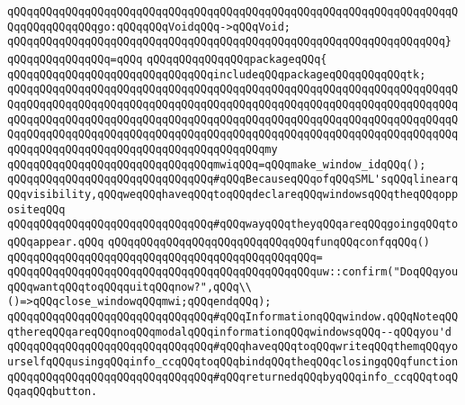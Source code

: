 \verb|qQQqqQQqqQQqqQQqqQQqqQQqqQQqqQQqqQQqqQQqqQQqqQQqqQQqqQQqqQQqqQQqqQQqqQQqqQQqqQQqqQQqgo:qQQqqQQqVoidqQQq->qQQqVoid;|\newline
\verb|qQQqqQQqqQQqqQQqqQQqqQQqqQQqqQQqqQQqqQQqqQQqqQQqqQQqqQQqqQQqqQQqqQQq}|\newline
\verb|qQQqqQQqqQQqqQQq=qQQq|\newline
\newline
\verb|qQQqqQQqqQQqqQQqpackageqQQq{|\newline
\newline
\verb|qQQqqQQqqQQqqQQqqQQqqQQqqQQqqQQqincludeqQQqpackageqQQqqQQqqQQqtk;|\newline
\verb|qQQqqQQqqQQqqQQqqQQqqQQqqQQqqQQqqQQqqQQqqQQqqQQqqQQqqQQqqQQqqQQqqQQqqQQqqQQqqQQqqQQqqQQqqQQqqQQqqQQqqQQqqQQqqQQqqQQqqQQqqQQqqQQqqQQqqQQqqQQqqQQqqQQqqQQqqQQqqQQqqQQqqQQqqQQqqQQqqQQqqQQqqQQqqQQqqQQqqQQqqQQqqQQqqQQqqQQqqQQqqQQqqQQqqQQqqQQqqQQqqQQqqQQqqQQqqQQqqQQqqQQqqQQqqQQqqQQqqQQqqQQqqQQqqQQqqQQqqQQqqQQqqQQqqQQqqQQqqQQqmy|\newline
\verb|qQQqqQQqqQQqqQQqqQQqqQQqqQQqqQQqmwiqQQq=qQQqmake_window_idqQQq();|\newline
\newline
\verb|qQQqqQQqqQQqqQQqqQQqqQQqqQQqqQQq#qQQqBecauseqQQqofqQQqSML'sqQQqlinearqQQqvisibility,qQQqweqQQqhaveqQQqtoqQQqdeclareqQQqwindowsqQQqtheqQQqoppositeqQQq|\newline
\verb|qQQqqQQqqQQqqQQqqQQqqQQqqQQqqQQq#qQQqwayqQQqtheyqQQqareqQQqgoingqQQqtoqQQqappear.qQQq|\newline
\newline
\verb|qQQqqQQqqQQqqQQqqQQqqQQqqQQqqQQqfunqQQqconfqqQQq()|\newline
\verb|qQQqqQQqqQQqqQQqqQQqqQQqqQQqqQQqqQQqqQQqqQQqqQQq=|\newline
\verb|qQQqqQQqqQQqqQQqqQQqqQQqqQQqqQQqqQQqqQQqqQQqqQQquw::confirm("DoqQQqyouqQQqwantqQQqtoqQQqquitqQQqnow?",qQQq\\()=>qQQqclose_windowqQQqmwi;qQQqendqQQq);|\newline
\newline
\verb|qQQqqQQqqQQqqQQqqQQqqQQqqQQqqQQq#qQQqInformationqQQqwindow.qQQqNoteqQQqthereqQQqareqQQqnoqQQqmodalqQQqinformationqQQqwindowsqQQq--qQQqyou'd|\newline
\verb|qQQqqQQqqQQqqQQqqQQqqQQqqQQqqQQq#qQQqhaveqQQqtoqQQqwriteqQQqthemqQQqyourselfqQQqusingqQQqinfo_ccqQQqtoqQQqbindqQQqtheqQQqclosingqQQqfunction|\newline
\verb|qQQqqQQqqQQqqQQqqQQqqQQqqQQqqQQq#qQQqreturnedqQQqbyqQQqinfo_ccqQQqtoqQQqaqQQqbutton.|\newline
